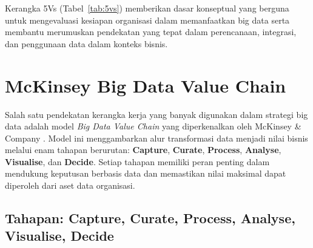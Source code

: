 \begin{longtable}{|p{}|p{}|p{}|}
\end{longtable}



Kerangka 5Vs (Tabel~\ref{tab:5vs}) memberikan dasar konseptual yang berguna untuk mengevaluasi kesiapan organisasi dalam memanfaatkan big data serta membantu merumuskan pendekatan yang tepat dalam perencanaan, integrasi, dan penggunaan data dalam konteks bisnis.

\section{McKinsey Big Data Value Chain}

Salah satu pendekatan kerangka kerja yang banyak digunakan dalam strategi big data adalah model \textit{Big Data Value Chain} yang diperkenalkan oleh McKinsey \& Company \cite{mckinsey2011}. Model ini menggambarkan alur transformasi data menjadi nilai bisnis melalui enam tahapan berurutan: \textbf{Capture}, \textbf{Curate}, \textbf{Process}, \textbf{Analyse}, \textbf{Visualise}, dan \textbf{Decide}. Setiap tahapan memiliki peran penting dalam mendukung keputusan berbasis data dan memastikan nilai maksimal dapat diperoleh dari aset data organisasi.

\subsection{Tahapan: Capture, Curate, Process, Analyse, Visualise, Decide}

